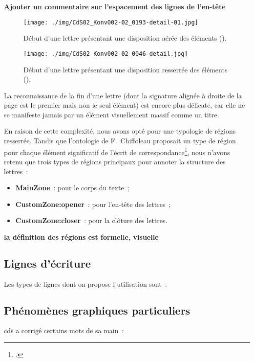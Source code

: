 \documentclass[a4paper,12pt,twoside]{book}
\begin{document}
				\textbf{Ajouter un commentaire sur l'espacement des lignes de l'en-tête}
				
				\begin{figure}[!h]
					\centering
					\texttt{[image: ./img/CdS02\_Konv002-02\_0193-detail-01.jpg]}%
					\caption{Début d'une lettre présentant une disposition aérée des éléments (\cite{CdS02001369}).}%
					\label{}%
				\end{figure}
			
				\begin{figure}[!h]
					\centering
					\texttt{[image: ./img/CdS02\_Konv002-02\_0046-detail.jpg]}%
					\caption{Début d'une lettre présentant une disposition resserrée des éléments (\cite{CdS02001369}).}%
					\label{}%
				\end{figure}
				
				La reconnaissance de la fin d'une lettre (dont la signature alignée à droite de la page est le premier mais non le seul élément) est encore plus délicate, car elle ne se manifeste jamais par un élément visuellement massif comme un titre.
				
				En raison de cette complexité, nous avons opté pour une typologie de régions resserrée. Tandis que l'ontologie de F.~Chiffoleau proposait un type de région pour chaque élément significatif de l'écrit de correspondance\footcite{chiffoleauCorrespondanceLangueFrancaise2021}, nous n'avons retenu que trois types de régions principaux pour annoter la structure des lettres~:
				
				\begin{itemize}
					\item \textbf{MainZone}~: pour le corps du texte~;
					\item \textbf{CustomZone:opener}~: pour l'en-tête des lettres~;
					\item \textbf{CustomZone:closer}~: pour la clôture des lettres.
				\end{itemize}
			
				\textbf{la définition des régions est formelle, visuelle}
			
			\subsection{Lignes d'écriture}
				Les types de lignes dont on propose l'utilisation sont~:
						
			\subsection{Phénomènes graphiques particuliers}
				 \gls{cds} a corrigé certains mots de sa main~:
			
\end{document}
